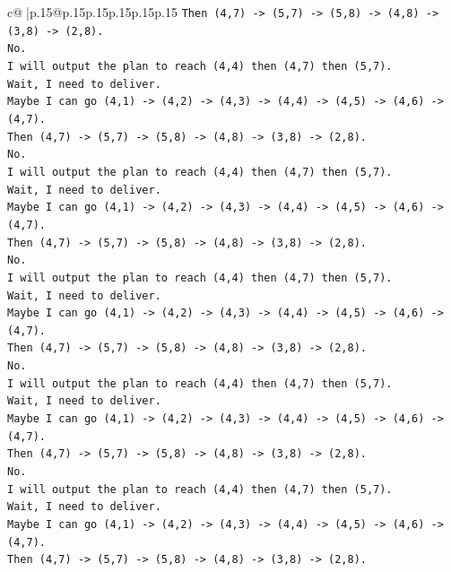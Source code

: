 \documentclass{article}
\begin{document}
{\begin{supertabular}{c@{$\;$}|p{.15\linewidth}@{}p{.15\linewidth}p{.15\linewidth}p{.15\linewidth}p{.15\linewidth}p{.15\linewidth}}
{{{\texttt{Then (4,7) {-}> (5,7) {-}> (5,8) {-}> (4,8) {-}> (3,8) {-}> (2,8).} \\
\texttt{No.} \\
\texttt{I will output the plan to reach (4,4) then (4,7) then (5,7).} \\
\texttt{Wait, I need to deliver.} \\
\texttt{Maybe I can go (4,1) {-}> (4,2) {-}> (4,3) {-}> (4,4) {-}> (4,5) {-}> (4,6) {-}> (4,7).} \\
\texttt{Then (4,7) {-}> (5,7) {-}> (5,8) {-}> (4,8) {-}> (3,8) {-}> (2,8).} \\
\texttt{No.} \\
\texttt{I will output the plan to reach (4,4) then (4,7) then (5,7).} \\
\texttt{Wait, I need to deliver.} \\
\texttt{Maybe I can go (4,1) {-}> (4,2) {-}> (4,3) {-}> (4,4) {-}> (4,5) {-}> (4,6) {-}> (4,7).} \\
\texttt{Then (4,7) {-}> (5,7) {-}> (5,8) {-}> (4,8) {-}> (3,8) {-}> (2,8).} \\
\texttt{No.} \\
\texttt{I will output the plan to reach (4,4) then (4,7) then (5,7).} \\
\texttt{Wait, I need to deliver.} \\
\texttt{Maybe I can go (4,1) {-}> (4,2) {-}> (4,3) {-}> (4,4) {-}> (4,5) {-}> (4,6) {-}> (4,7).} \\
\texttt{Then (4,7) {-}> (5,7) {-}> (5,8) {-}> (4,8) {-}> (3,8) {-}> (2,8).} \\
\texttt{No.} \\
\texttt{I will output the plan to reach (4,4) then (4,7) then (5,7).} \\
\texttt{Wait, I need to deliver.} \\
\texttt{Maybe I can go (4,1) {-}> (4,2) {-}> (4,3) {-}> (4,4) {-}> (4,5) {-}> (4,6) {-}> (4,7).} \\
\texttt{Then (4,7) {-}> (5,7) {-}> (5,8) {-}> (4,8) {-}> (3,8) {-}> (2,8).} \\
\texttt{No.} \\
\texttt{I will output the plan to reach (4,4) then (4,7) then (5,7).} \\
\texttt{Wait, I need to deliver.} \\
\texttt{Maybe I can go (4,1) {-}> (4,2) {-}> (4,3) {-}> (4,4) {-}> (4,5) {-}> (4,6) {-}> (4,7).} \\
\texttt{Then (4,7) {-}> (5,7) {-}> (5,8) {-}> (4,8) {-}> (3,8) {-}> (2,8).} \\
}}}
\end{supertabular}}
\end{document}
